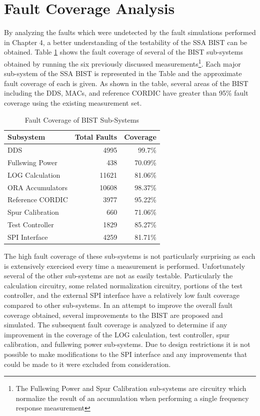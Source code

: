 \documentclass[12pt]{report}
\begin{document}
\section{Fault Coverage Analysis}
By analyzing the faults which were undetected by the fault simulations performed in Chapter 4, a better understanding of the testability of the SSA BIST can be obtained.  Table \ref{tbl:faultsubsystems} shows the fault coverage of several of the BIST sub-systems obtained by running the six previously discussed measurements\footnote{The Fullswing Power and Spur Calibration sub-systems are circuitry which normalize the result of an accumulation when performing a single frequency response measurement}. Each major sub-system of the SSA BIST is represented in the Table and the approximate fault coverage of each is given.  As shown in the table, several areas of the BIST including the DDS, MACs, and reference CORDIC have greater than 95\% fault coverage using the existing measurement set.  
\begin{table}
  \begin{center}
    \caption{Fault Coverage of BIST Sub-Systems}
    \label{tbl:faultsubsystems}

    \begin{tabular}{|l|r|r|}
      \hline
      Subsystem & Total Faults & Coverage \\ \hline
      DDS & 4995 & 99.7\% \\ \hline
      Fullswing Power & 438 & 70.09\% \\ \hline
      LOG Calculation & 11621 & 81.06\% \\ \hline
      ORA Accumulators & 10608 & 98.37\% \\ \hline
      Reference CORDIC & 3977 & 95.22\% \\ \hline
      Spur Calibration & 660 & 71.06\% \\ \hline
      Test Controller & 1829 & 85.27\% \\ \hline
      SPI Interface & 4259 & 81.71\% \\
      \hline
    \end{tabular}
  \end{center}
\end{table}
The high fault coverage of these sub-systems is not particularly surprising as each is extensively exercised every time a measurement is performed.  Unfortunately several of the other sub-systems are not as easily testable.  Particularly the calculation circuitry, some related normalization circuitry, portions of the test controller, and the external SPI interface have a relatively low fault coverage compared to other sub-systems.  In an attempt to improve the overall fault coverage obtained, several improvements to the BIST are proposed and simulated.  The subsequent fault coverage is analyzed to determine if any improvement in the coverage of the LOG calculation, test controller, spur calibration, and fullswing power sub-systems.  Due to design restrictions it is not possible to make modifications to the SPI interface and any improvements that could be made to it were excluded from consideration.
\end{document}
